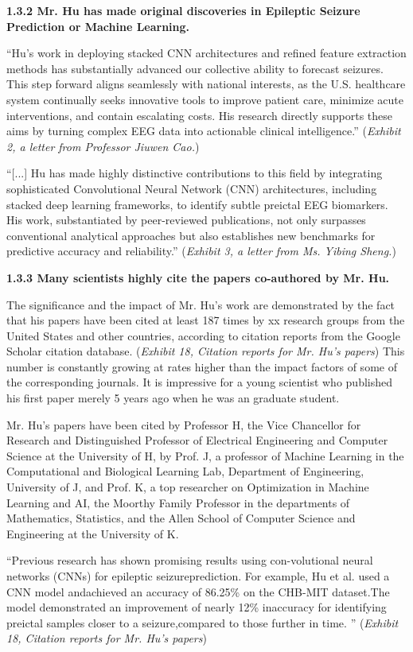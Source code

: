 \documentclass{article}
\begin{document}
{\bf 1.3.2 Mr. Hu has made original discoveries in Epileptic Seizure Prediction or Machine Learning. }

“Hu’s work in deploying stacked CNN architectures and refined feature extraction methods has substantially advanced our collective ability to forecast seizures. This step forward aligns seamlessly with national interests, as the U.S. healthcare system continually seeks innovative tools to improve patient care, minimize acute interventions, and contain escalating costs. His research directly supports these aims by turning complex EEG data into actionable clinical intelligence.” ({\it Exhibit 2, a letter from Professor Jiuwen Cao.}) 

“[...] Hu has made highly distinctive contributions to this field by integrating sophisticated Convolutional Neural Network (CNN) architectures, including stacked deep learning frameworks, to identify subtle preictal EEG biomarkers. His work, substantiated by peer-reviewed publications, not only surpasses conventional analytical approaches but also establishes new benchmarks for predictive accuracy and reliability.” ({\it Exhibit 3, a letter from Ms. Yibing Sheng.}) 

{\bf 1.3.3 Many scientists highly cite the papers co-authored by Mr. Hu. }

The significance and the impact of Mr. Hu’s work are demonstrated by the fact that his papers have been cited at least 187 times by xx research groups from the United States and other countries, according to citation reports from the Google Scholar citation database. ({\it Exhibit 18, Citation reports for Mr. Hu’s papers}) This number is constantly growing at rates higher than the impact factors of some of the corresponding journals. It is impressive for a young scientist who published his first paper merely 5 years ago when he was an graduate student. 

Mr. Hu’s papers have been cited by Professor H, the Vice Chancellor for Research and Distinguished Professor of Electrical Engineering and Computer Science at the University of H, by Prof. J, a professor of Machine Learning in the Computational and Biological Learning Lab, Department of Engineering, University of J, and Prof. K, a top researcher on Optimization in Machine Learning and AI, the Moorthy Family Professor in the departments of Mathematics, Statistics, and the Allen School of Computer Science and Engineering at the University of K.

“Previous research has shown promising results using con-volutional neural networks (CNNs) for epileptic seizureprediction. For example, Hu et al. used a CNN model andachieved an accuracy of 86.25\% on the CHB-MIT dataset.The model demonstrated an improvement of nearly 12\% inaccuracy for identifying preictal samples closer to a seizure,compared to those further in time. ” ({\it Exhibit 18, Citation reports for Mr. Hu’s papers})
\end{document}
